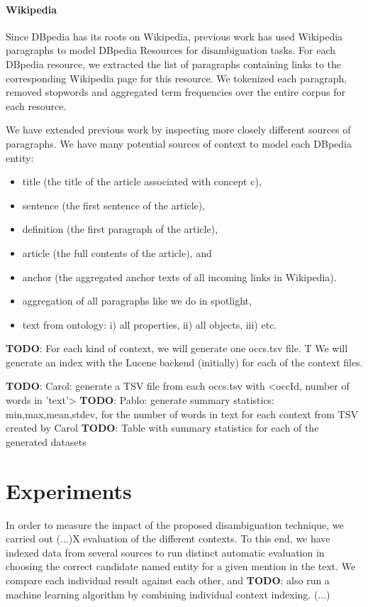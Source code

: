 \documentclass[10pt,a4paper]{article}
\newcommand{\todo}[1]{{\color{red}\textsf{\textbf{TODO}}: #1}}
\begin{document}
\paragraph{Wikipedia}
Since DBpedia has its roots on Wikipedia, previous work \cite{isem11mendes} has used Wikipedia paragraphs to model DBpedia Resources for disambiguation tasks.
For each DBpedia resource, we extracted the list of paragraphs containing links to the corresponding Wikipedia page for this resource. 
We tokenized each paragraph, removed stopwords and aggregated term frequencies over the entire corpus for each resource.

We have extended previous work by inspecting more closely different sources of paragraphs.
We have many potential sources of context to model each DBpedia entity:
\begin{itemize}
\item title (the title of the article associated with concept c), 
\item sentence (the first sentence of the article),
\item definition (the first paragraph of the article), 
\item article (the full contents of the article), and 
\item anchor (the aggregated anchor texts of all incoming links in Wikipedia).
\item aggregation of all paragraphs like we do in spotlight,
\item text from ontology: i) all properties, ii) all objects, iii) etc.
\end{itemize}

\todo{For each kind of context, we will generate one occs.tsv file. T
We will generate an index with the Lucene backend (initially) for each of the context files. }

\todo{Carol: generate a TSV file from each occs.tsv with <occId, number of words in 'text'>}
\todo{Pablo: generate summary statistics: min,max,mean,stdev, for the number of words in text for each context from TSV created by Carol}
\todo{Table with summary statistics for each of the generated datasets}



\section{Experiments}

In order to measure the impact of the proposed disambiguation technique, we carried out  (...)X evaluation of the different contexts. To this end, we have indexed data from several sources to run distinct automatic evaluation in choosing the correct candidate named entity for a given mention in the text. We compare each individual result against each other, and \todo{also run a machine learning algorithm by combining individual context indexing. (...) }
\end{document}
